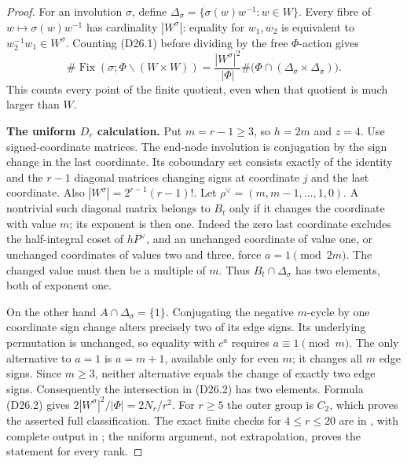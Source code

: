 \begin{proof}
For an involution $\sigma$, define
$\Delta_\sigma=\{\sigma(w)w^{-1}:w\in W\}$.
Every fibre of $w\mapsto\sigma(w)w^{-1}$ has cardinality
$|W^\sigma|$: equality for $w_1,w_2$ is equivalent to
$w_2^{-1}w_1\in W^\sigma$.
Counting (D26.1) before dividing by the free $\Phi$-action gives
\[
 \#\operatorname{Fix}(\sigma;\Phi\backslash(W\times W))
 =\frac{|W^\sigma|^2}{|\Phi|}
   \#\bigl(\Phi\cap(\Delta_\sigma\times\Delta_\sigma)\bigr).
                                                               \tag{D26.2}
\]
This counts every point of the finite quotient, even when that
quotient is much larger than $W$.

\medskip\noindent\textbf{The uniform $D_r$ calculation.}
Put $m=r-1\ge3$, so $h=2m$ and $z=4$.
Use signed-coordinate matrices.  The end-node involution is
conjugation by the sign change in the last coordinate.
Its coboundary set consists exactly of the identity and the
$r-1$ diagonal matrices changing signs at coordinate $j$ and
the last coordinate.  Also
$|W^\sigma|=2^{r-1}(r-1)!$.
Let $\rho^\vee=(m,m-1,\ldots,1,0)$.
A nontrivial such diagonal matrix belongs to $B_t$ only if
it changes the coordinate with value $m$; its exponent is then one.
Indeed the zero last coordinate excludes the half-integral
coset of $hP^\vee$, and an unchanged coordinate of value one,
or unchanged coordinates of values two and three, force
$a=1\pmod {2m}$.  The changed value must then be a multiple of $m$.
Thus $B_t\cap\Delta_\sigma$ has two elements, both of exponent one.

On the other hand $A\cap\Delta_\sigma=\{1\}$.
Conjugating the negative $m$-cycle by one coordinate sign change
alters precisely two of its edge signs.  Its underlying permutation
is unchanged, so equality with $c^a$ requires $a\equiv1\pmod m$.
The only alternative to $a=1$ is $a=m+1$, available only for even
$m$; it changes all $m$ edge signs.  Since $m\ge3$, neither
alternative equals the change of exactly two edge signs.
Consequently the intersection in (D26.2) has two elements.
Formula (D26.2) gives
$2|W^\sigma|^2/|\Phi|=2N_r/r^2$.
For $r\ge5$ the outer group is $C_2$, which proves the asserted
full classification.  The exact finite checks for $4\le r\le20$
are in , with complete output
in ; the uniform argument,
not extrapolation, proves the statement for every rank.


\end{proof}
